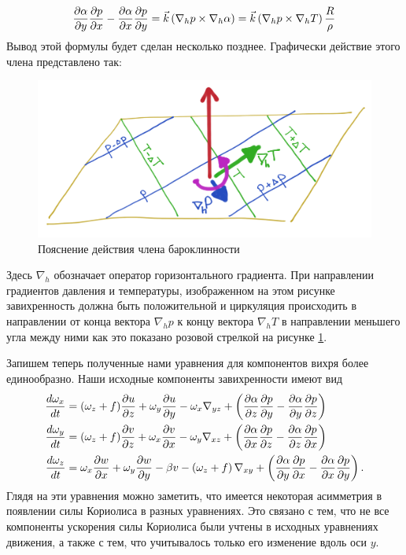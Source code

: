 \begin{equation*}
    \displaystyle\frac{\partial \alpha}{\partial y}\displaystyle\frac{\partial p}{\partial x}-\displaystyle\frac{\partial \alpha}{\partial x}\displaystyle\frac{\partial p}{\partial y}=\vec{k} \left( \nabla_hp \times \nabla_h\alpha \right) = \vec{k} \left( \nabla_hp \times \nabla_hT \right) \frac{R}{\rho}  
\end{equation*}
{\color{red}Вывод этой формулы будет сделан несколько позднее.} Графически действие этого члена представлено так: 
    \begin{figure}[h]
    \centering
    \includegraphics[width=0.9\linewidth]{pics/ch10.3.png}
    \caption{\label{fig:ch10.3}
    Пояснение действия члена бароклинности
    }
    \end{figure}    
Здесь $\nabla_h$ обозначает оператор горизонтального градиента. При направлении градиентов давления и температуры, изображенном на этом рисунке завихренность должна быть положительной и циркуляция происходить в направлении от конца вектора $\nabla_hp$ к концу вектора $\nabla_hT$ в направлении {\color{red}меньшего угла между ними} как это показано розовой стрелкой на рисунке \ref{fig:ch10.3}. 

Запишем теперь полученные нами уравнения для компонентов вихря более единообразно. Наши исходные компоненты завихренности имеют вид
\begin{align}
    \displaystyle\frac{d \omega_x}{d t}&= (\omega_z+f)\displaystyle\frac{\partial u}{\partial z} + \omega_y\displaystyle\frac{\partial u}{\partial y}
    -\omega_x\nabla_{yz}+\left( \displaystyle\frac{\partial \alpha}{\partial z}\displaystyle\frac{\partial p}{\partial y} - \displaystyle\frac{\partial \alpha}{\partial y}\displaystyle\frac{\partial p}{\partial z} \right) \label{eq:ch10_omegax1} \\
    \displaystyle\frac{d \omega_y}{d t}&=(\omega_z+f)\displaystyle\frac{\partial v}{\partial z} + \omega_x\displaystyle\frac{\partial v}{\partial x}
    -\omega_y\nabla_{xz}+\left( \displaystyle\frac{\partial \alpha}{\partial x}\displaystyle\frac{\partial p}{\partial z} - \displaystyle\frac{\partial \alpha}{\partial z}\displaystyle\frac{\partial p}{\partial x} \right) \label{eq:ch10_omegay1} \\
    \displaystyle\frac{d \omega_z}{d t}&=
    \omega_x\displaystyle\frac{\partial w}{\partial x} + \omega_y\displaystyle\frac{\partial w}{\partial y} -\beta v - 
    \left( \omega_z + f \right) \nabla_{xy}+
    \left( \displaystyle\frac{\partial \alpha}{\partial y}\displaystyle\frac{\partial p}{\partial x} - \displaystyle\frac{\partial \alpha}{\partial x}\displaystyle\frac{\partial p}{\partial y} \right) \label{eq:ch10_omegaz1}.
\end{align}
Глядя на эти уравнения можно заметить, что имеется некоторая асимметрия в появлении силы Кориолиса в разных уравнениях. Это связано с тем, что не все компоненты ускорения силы Кориолиса были учтены в исходных уравнениях движения, а также с тем, что учитывалось только его изменение вдоль оси $y$. 

